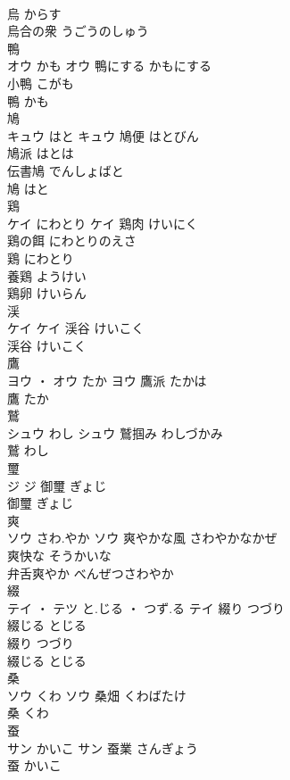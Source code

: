\documentclass[8pt]{extreport}
\begin{document}
\begin{CJK}{UTF8}{min}
\\	烏	からす	
\\	烏合の衆	うごうのしゅう	
\\	鴨	
\\	オウ	かも	オウ	鴨にする	かもにする	
\\	小鴨	こがも	
\\	鴨	かも	
\\	鳩	
\\	キュウ	はと	キュウ	鳩便	はとびん	
\\	鳩派	はとは	
\\	伝書鳩	でんしょばと	
\\	鳩	はと	
\\	鶏	
\\	ケイ	にわとり	ケイ	鶏肉	けいにく	
\\	鶏の餌	にわとりのえさ	
\\	鶏	にわとり	
\\	養鶏	ようけい	
\\	鶏卵	けいらん	
\\	渓	
\\	ケイ		ケイ	渓谷	けいこく	
\\	渓谷	けいこく	
\\	鷹	
\\	ヨウ ・ オウ	たか	ヨウ	鷹派	たかは	
\\	鷹	たか	
\\	鷲	
\\	シュウ	わし	シュウ	鷲掴み	わしづかみ	
\\	鷲	わし	
\\	璽	
\\	ジ		ジ	御璽	ぎょじ	
\\	御璽	ぎょじ	
\\	爽	
\\	ソウ	さわ.やか	ソウ	爽やかな風	さわやかなかぜ	
\\	爽快な	そうかいな	
\\	弁舌爽やか	べんぜつさわやか	
\\	綴	
\\	テイ ・ テツ	と.じる ・ つず.る	テイ	綴り	つづり	
\\	綴じる	とじる	
\\	綴り	つづり	
\\	綴じる	とじる	
\\	桑	
\\	ソウ	くわ	ソウ	桑畑	くわばたけ	
\\	桑	くわ	
\\	蚕	
\\	サン	かいこ	サン	蚕業	さんぎょう	
\\	蚕	かいこ	

\end{CJK}
\end{document}
